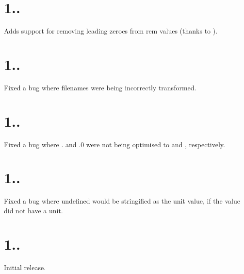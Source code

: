 \section*{1..}


\begin{DoxyItemize}
\item Adds support for removing leading zeroes from {\ttfamily rem} values (thanks to ).
\end{DoxyItemize}

\section*{1..}


\begin{DoxyItemize}
\item Fixed a bug where filenames were being incorrectly transformed.
\end{DoxyItemize}

\section*{1..}


\begin{DoxyItemize}
\item Fixed a bug where {.} and {\ttfamily .0} were not being optimised to {} and {}, respectively.
\end{DoxyItemize}

\section*{1..}


\begin{DoxyItemize}
\item Fixed a bug where {\ttfamily undefined} would be stringified as the unit value, if the value did not have a unit.
\end{DoxyItemize}

\section*{1..}


\begin{DoxyItemize}
\item Initial release. 
\end{DoxyItemize}